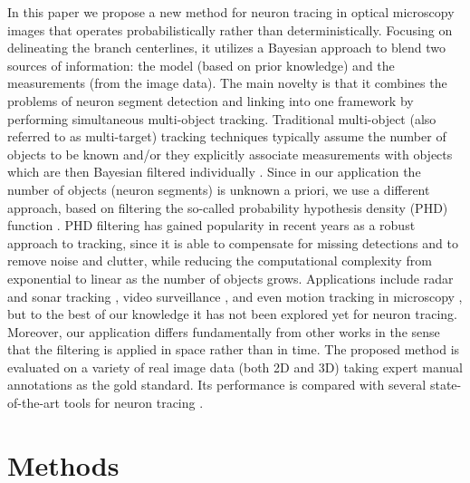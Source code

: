 \documentclass[noinfo,nocrop,final]{bioinfo}
\begin{document}
In this paper we propose a new method for neuron tracing in optical microscopy images that operates probabilistically rather than deterministically. Focusing on delineating the branch centerlines, it utilizes a Bayesian approach to blend two sources of information: the model (based on prior knowledge) and the measurements (from the image data). The main novelty is that it combines the problems of neuron segment detection and linking into one framework by performing simultaneous multi-object tracking. Traditional multi-object (also referred to as multi-target) tracking techniques \citep{mahler2007statistical,stone2013bayesian} typically assume the number of objects to be known and/or they explicitly associate measurements with objects which are then Bayesian filtered individually \citep{bar1995multitarget}. Since in our application the number of objects (neuron segments) is unknown a priori, we use a different approach, based on filtering the so-called probability hypothesis density (PHD) function \citep{mahler2003multitarget}. PHD filtering has gained popularity in recent years as a robust approach to tracking, since it is able to compensate for missing detections and to remove noise and clutter, while reducing the computational complexity from exponential to linear as the number of objects grows. Applications include radar and sonar tracking \citep{tobias2005probability, clark2007particle}, video surveillance \citep{maggio2008efficient, Wang-2008}, and even motion tracking in microscopy \citep{Wood-2012, Schlangen-2016}, but to the best of our knowledge it has not been explored yet for neuron tracing. Moreover, our application differs fundamentally from other works in the sense that the filtering is applied in space rather than in time.  The proposed method is evaluated on a variety of real image data (both 2D and 3D) taking expert manual annotations as the gold standard. Its performance is compared with several state-of-the-art tools for neuron tracing \citep{chothani2011automated, xiao2013app2, quan2015neurogps}.

\section{Methods}\label{sec:methods}
\end{document}
